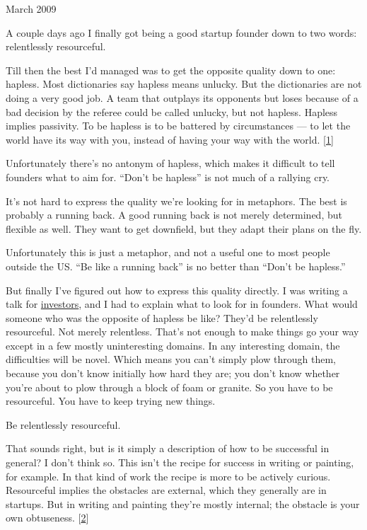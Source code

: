 March 2009

A couple days ago I finally got being a good startup founder down to two
words: relentlessly resourceful.

Till then the best I'd managed was to get the opposite quality down to
one: hapless. Most dictionaries say hapless means unlucky. But the
dictionaries are not doing a very good job. A team that outplays its
opponents but loses because of a bad decision by the referee could be
called unlucky, but not hapless. Hapless implies passivity. To be
hapless is to be battered by circumstances --- to let the world have its
way with you, instead of having your way with the world.
{[}\hyperref[f1n]{1}{]}

Unfortunately there's no antonym of hapless, which makes it difficult to
tell founders what to aim for. ``Don't be hapless'' is not much of a
rallying cry.

It's not hard to express the quality we're looking for in metaphors. The
best is probably a running back. A good running back is not merely
determined, but flexible as well. They want to get downfield, but they
adapt their plans on the fly.

Unfortunately this is just a metaphor, and not a useful one to most
people outside the US. ``Be like a running back'' is no better than
``Don't be hapless.''

But finally I've figured out how to express this quality directly. I was
writing a talk for \href{angelinvesting.html}{investors}, and I had to
explain what to look for in founders. What would someone who was the
opposite of hapless be like? They'd be relentlessly resourceful. Not
merely relentless. That's not enough to make things go your way except
in a few mostly uninteresting domains. In any interesting domain, the
difficulties will be novel. Which means you can't simply plow through
them, because you don't know initially how hard they are; you don't know
whether you're about to plow through a block of foam or granite. So you
have to be resourceful. You have to keep trying new things.

Be relentlessly resourceful.

That sounds right, but is it simply a description of how to be
successful in general? I don't think so. This isn't the recipe for
success in writing or painting, for example. In that kind of work the
recipe is more to be actively curious. Resourceful implies the obstacles
are external, which they generally are in startups. But in writing and
painting they're mostly internal; the obstacle is your own obtuseness.
{[}\hyperref[f2n]{2}{]}

